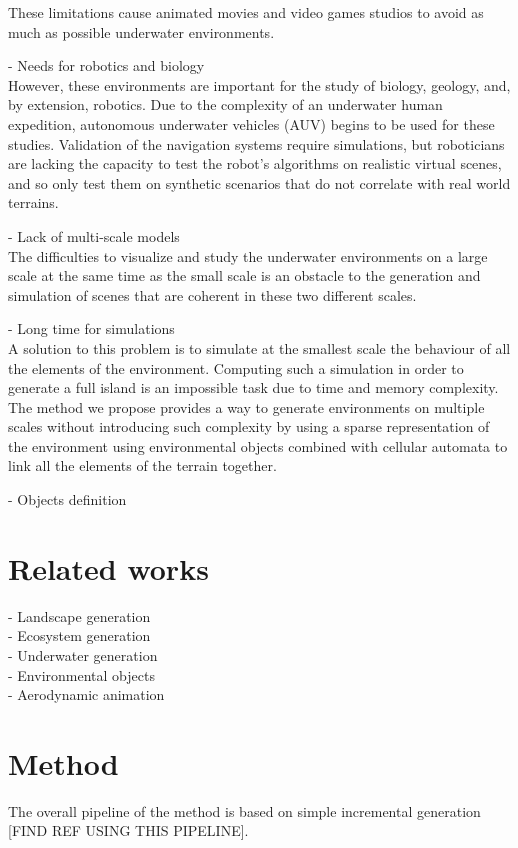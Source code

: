 \documentclass{egpubl}
\begin{document}
These limitations cause animated movies and video games studios to avoid as much as possible underwater environments. 

- Needs for robotics and biology \\
However, these environments are important for the study of biology, geology, and, by extension, robotics. Due to the complexity of an underwater human expedition, autonomous underwater vehicles (AUV) begins to be used for these studies. Validation of the navigation systems require simulations, but roboticians are lacking the capacity to test the robot's algorithms on realistic virtual scenes, and so only test them on synthetic scenarios that do not correlate with real world terrains.

- Lack of multi-scale models \\
The difficulties to visualize and study the underwater environments on a large scale at the same time as the small scale is an obstacle to the generation and simulation of scenes that are coherent in these two different scales.

- Long time for simulations \\
A solution to this problem is to simulate at the smallest scale the behaviour of all the elements of the environment. Computing such a simulation in order to generate a full island is an impossible task due to time and memory complexity. The method we propose provides a way to generate environments on multiple scales without introducing such complexity by using a sparse representation of the environment using environmental objects combined with cellular automata to link all the elements of the terrain together.

- Objects definition \\


\section{Related works}
- Landscape generation \\
- Ecosystem generation \\
- Underwater generation \\
- Environmental objects \cite{Grosbellet2016b} \\ 
- Aerodynamic animation \cite{Wejchert1991} \\


\section{Method}
The overall pipeline of the method is based on simple incremental generation [FIND REF USING THIS PIPELINE].
\end{document}
